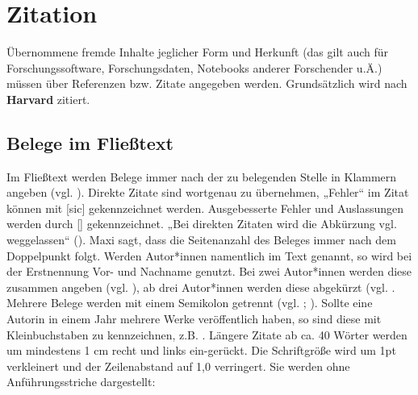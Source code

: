 \section{Zitation}
Übernommene fremde Inhalte jeglicher Form und Herkunft (das gilt auch für Forschungssoftware, Forschungsdaten, Notebooks anderer Forschender u.Ä.) müssen über Referenzen bzw. Zitate angegeben werden. Grundsätzlich wird nach \textbf{Harvard} zitiert.
\subsection{Belege im Fließtext}
Im Fließtext werden Belege immer nach der zu belegenden Stelle in Klammern angeben (vgl. \cite [S.~50]{Musterfrau2015}). Direkte Zitate sind wortgenau zu übernehmen, „Fehler“ im Zitat können mit [sic] gekennzeichnet werden. Ausgebesserte Fehler und Auslassungen werden durch [] gekennzeichnet. „Bei direkten Zitaten wird die Abkürzung vgl. weggelassen“ (\cite [S.~65]{Mustermann2023}). Maxi  \textcite [S.~7]{Musterkind2019} sagt, dass die Seitenanzahl des Beleges immer nach dem Doppelpunkt folgt. Werden Autor*innen namentlich im Text genannt, so wird bei der Erstnennung Vor- und Nachname genutzt. Bei zwei Autor*innen werden diese zusammen angeben (vgl. \cite [S. ~2]{Herzog/König}), ab drei Autor*innen werden diese abgekürzt (vgl. \cite [S.~77] {Maier/Müller/Bauer/Fischer}. Mehrere Belege werden mit einem Semikolon getrennt (vgl. \cite [S. ~9] {Frühling}; \cite [S. ~28]{Sommer}). 
Sollte eine Autorin in einem Jahr mehrere Werke veröffentlich haben, so sind diese mit Kleinbuchstaben zu kennzeichnen, z.B. \cite{Maier1} \cite{Maier2}.\newline
Längere Zitate ab ca. 40 Wörter werden um mindestens 1 cm recht und links ein-gerückt. Die Schriftgröße wird um 1pt verkleinert und der Zeilenabstand auf 1,0 verringert. Sie werden ohne Anführungsstriche dargestellt:
